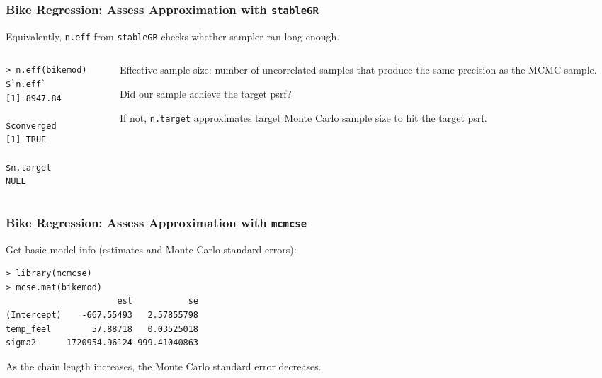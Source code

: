 \documentclass{beamer}
\begin{document}
\begin{frame}[fragile]
 \frametitle{ Bike Regression: Assess Approximation with \texttt{stableGR}    }

Equivalently, \texttt{n.eff} from \texttt{stableGR} checks whether sampler ran long enough.

\begin{columns}
\begin{column}{0.3\textwidth}

\begin{verbatim}
> n.eff(bikemod)
$`n.eff`
[1] 8947.84

$converged
[1] TRUE

$n.target
NULL
\end{verbatim}

\end{column}
\begin{column}{0.6\textwidth} 
\vspace{.3cm}

{\small Effective sample size: number of uncorrelated samples that produce the same precision as the MCMC sample. \\

\vspace{1cm}

Did our sample achieve the target psrf?\\

\vspace{.8cm}

If not, \texttt{n.target} approximates target Monte Carlo sample size to hit the target psrf.}

\end{column}
\end{columns}


\end{frame}









\begin{frame}[fragile]
 \frametitle{ Bike Regression: Assess Approximation with \texttt{mcmcse}    }
Get basic model info (estimates and Monte Carlo standard errors):
\begin{verbatim}
> library(mcmcse)
> mcse.mat(bikemod)
                      est           se
(Intercept)    -667.55493   2.57855798
temp_feel        57.88718   0.03525018
sigma2      1720954.96124 999.41040863
\end{verbatim}
As the chain length increases, the Monte Carlo standard error decreases.
\end{frame}
\end{document}
